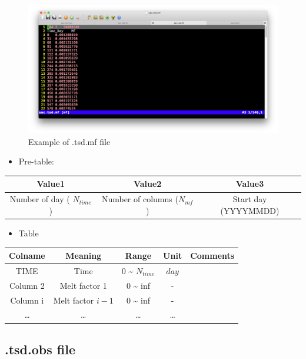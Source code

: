 \documentclass[]{scrbook}
\providecommand{\tightlist}{%
  \setlength{\itemsep}{0pt}\setlength{\parskip}{0pt}}
\begin{document}
\begin{figure}
\centering
\includegraphics{Fig/IO/tsd.mf.png}
\caption{Example of .tsd.mf file}
\end{figure}

\begin{itemize}
\tightlist
\item
  Pre-table:
\end{itemize}

\begin{longtable}[]{@{}ccc@{}}
\toprule
Value1 & Value2 & Value3\tabularnewline
\midrule
\endhead
Number of day ( \(N_{time}\)) & Number of columns (\(N_{mf}\)) & Start
day (YYYYMMDD)\tabularnewline
\bottomrule
\end{longtable}

\begin{itemize}
\tightlist
\item
  Table
\end{itemize}

\begin{longtable}[]{@{}ccccc@{}}
\toprule
Colname & Meaning & Range & Unit & Comments\tabularnewline
\midrule
\endhead
TIME & Time & 0 \textasciitilde{} \(N_{time}\) & \(day\)
&\tabularnewline
Column 2 & Melt factor 1 & 0 \textasciitilde{} inf & - &\tabularnewline
Column i & Melt factor \(i-1\) & 0 \textasciitilde{} inf & -
&\tabularnewline
\ldots{} & \ldots{} & \ldots{} & \ldots{} &\tabularnewline
\bottomrule
\end{longtable}

\subsection{.tsd.obs file}\label{tsd.obs-file}
\end{document}
